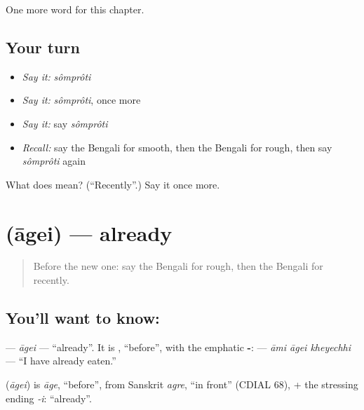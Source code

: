 \begin{grammarlens}[title={What you've built}]
One more word for this chapter.
\end{grammarlens}

\subsection*{Your turn}
\begin{itemize}
\raggedright
  \item \emph{Say it:} \emph{sômprôti}
  \item \emph{Say it:} \emph{sômprôti}, once more
  \item \emph{Say it:} say \emph{sômprôti}
  \item \emph{Recall:} say the Bengali for smooth, then the Bengali for rough, then say \emph{sômprôti} again
\end{itemize}

\begin{tcolorbox}[breakable,colback=teal!4,colframe=teal!35!black,title={Before you move on}]
What does  mean? (\textquotedblleft{}Recently\textquotedblright{}.) Say it once more.
\end{tcolorbox}
\section[\texorpdfstring{\bn{আগেই} (āgei)}{আগেই (āgei)}]{ (āgei) — already}

\label{lesson:BN-C145-agei}



\begin{quote}
Before the new one: say the Bengali for rough, then the Bengali for recently.
\end{quote}

\subsection*{You'll want to know: }
\textbf{} — \emph{āgei} — \textquotedblleft{}already\textquotedblright{}. It is \textbf{}, \textquotedblleft{}before\textquotedblright{}, with the emphatic \textbf{-}: \textbf{  } — \emph{āmi āgei kheyechhi} — \textquotedblleft{}I have already eaten.\textquotedblright{}

\begin{cousinweb}
\textbf{} (\emph{āgei}) is \emph{āge}, \textquotedblleft{}before\textquotedblright{}, from Sanskrit \emph{agre}, \textquotedblleft{}in front\textquotedblright{} (CDIAL 68), + the stressing ending \emph{-i}: \textquotedblleft{}already\textquotedblright{}.
\end{cousinweb}

